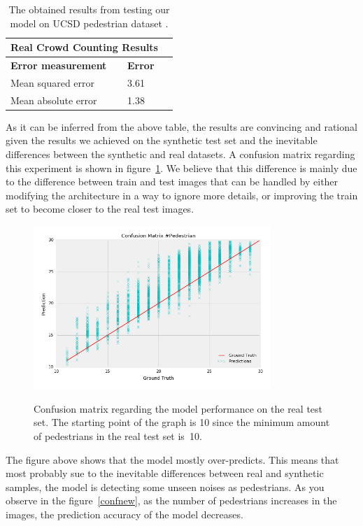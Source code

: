 \begin{table}[H]
\centering
\small\sffamily
\begin{tabular}{llr}
\multicolumn{2}{c}{\textbf{\textbf{Real Crowd Counting Results}}} \\
\bottomrule
\textbf{Error measurement}        & \textbf{Error} \\
\bottomrule
Mean squared error       & 3.61  \\
Mean absolute error      & 1.38  \\
\bottomrule
\end{tabular}
\caption{The obtained results from testing our model on UCSD pedestrian dataset \cite{chan2008privacy}. }
\label{tab:ucsdreal}
\end{table} 

As it can be inferred from the above table, the results are convincing and rational given the results we achieved on the synthetic test set and the inevitable differences between the synthetic and real datasets. A confusion matrix regarding this experiment is shown in figure~\ref{confnew2}. We believe that this difference is mainly due to the difference between train and test images that can be handled by either modifying the architecture in a way to ignore more details, or improving the train set to become closer to the real test images. 

\begin{figure}[H]
	\centering
	{\includegraphics[width=0.8\textwidth]{images/realtestfig}}
	\caption{Confusion matrix regarding the model performance on the real test set. The starting point of the graph is 10 since the minimum amount of pedestrians in the real test set is~10.}
	\label{confnew2}
\end{figure}
The figure above shows that the model mostly over-predicts. This means that most probably sue to the inevitable differences between real and synthetic samples, the model is detecting some unseen noises as pedestrians. As you observe in the figure~\ref{confnew}, as the number of pedestrians increases in the images, the prediction accuracy of the model decreases.  


